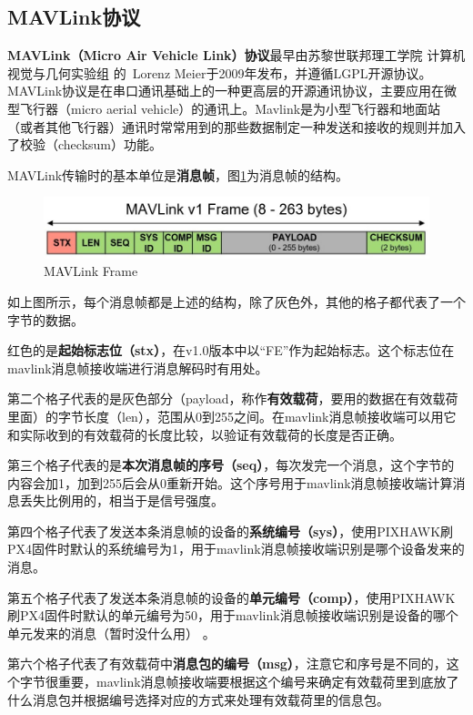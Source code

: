 \subsection{MAVLink协议}

\textbf{MAVLink（Micro Air Vehicle Link）协议}最早由苏黎世联邦理工学院 计算机视觉与几何实验组 的 Lorenz Meier于2009年发布，并遵循LGPL开源协议。MAVLink协议是在串口通讯基础上的一种更高层的开源通讯协议，主要应用在微型飞行器（micro aerial vehicle）的通讯上。Mavlink是为小型飞行器和地面站（或者其他飞行器）通讯时常常用到的那些数据制定一种发送和接收的规则并加入了校验（checksum）功能\cite{ArtE4}。

MAVLink传输时的基本单位是\textbf{消息帧}，图\ref{Fig:img7}为消息帧的结构。

\begin{figure}[ht]
  \centering
  \includegraphics[width=0.8\linewidth]{./Figure/Mavlink_Frame.jpg}
  \caption{MAVLink Frame}\label{Fig:img7}
\end{figure}

如上图所示，每个消息帧都是上述的结构，除了灰色外，其他的格子都代表了一个字节的数据。

红色的是\textbf{起始标志位（stx）}，在v1.0版本中以“FE”作为起始标志。这个标志位在mavlink消息帧接收端进行消息解码时有用处。

第二个格子代表的是灰色部分（payload，称作\textbf{有效载荷}，要用的数据在有效载荷里面）的字节长度（len），范围从0到255之间。在mavlink消息帧接收端可以用它和实际收到的有效载荷的长度比较，以验证有效载荷的长度是否正确。

第三个格子代表的是\textbf{本次消息帧的序号（seq）}，每次发完一个消息，这个字节的内容会加1，加到255后会从0重新开始。这个序号用于mavlink消息帧接收端计算消息丢失比例用的，相当于是信号强度。

第四个格子代表了发送本条消息帧的设备的\textbf{系统编号（sys）}，使用PIXHAWK刷PX4固件时默认的系统编号为1，用于mavlink消息帧接收端识别是哪个设备发来的消息。

第五个格子代表了发送本条消息帧的设备的\textbf{单元编号（comp）}，使用PIXHAWK刷PX4固件时默认的单元编号为50，用于mavlink消息帧接收端识别是设备的哪个单元发来的消息（暂时没什么用） 。

第六个格子代表了有效载荷中\textbf{消息包的编号（msg）}，注意它和序号是不同的，这个字节很重要，mavlink消息帧接收端要根据这个编号来确定有效载荷里到底放了什么消息包并根据编号选择对应的方式来处理有效载荷里的信息包。

